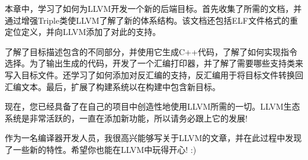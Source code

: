 本章中，学习了如何为LLVM开发一个新的后端目标。首先收集了所需的文档，并通过增强Triple类使LLVM了解了新的体系结构。该文档还包括ELF文件格式的重定位定义，并向LLVM添加了对此的支持。\par

了解了目标描述包含的不同部分，并使用它生成C++代码，了解了如何实现指令选择。为了输出生成的代码，开发了一个汇编打印器，并了解了需要哪些支持类来写入目标文件。还学习了如何添加对反汇编的支持，反汇编用于将目标文件转换回汇编文本。最后，扩展了构建系统以在构建中包含新目标。\par

现在，您已经具备了在自己的项目中创造性地使用LLVM所需的一切。LLVM生态系统是非常活跃的，一直在添加新功能，所以请务必跟上它的发展!\par

作为一名编译器开发人员，我很高兴能够写关于LLVM的文章，并在此过程中发现了一些新的特性。希望你也能在LLVM中玩得开心! :)

\newpage